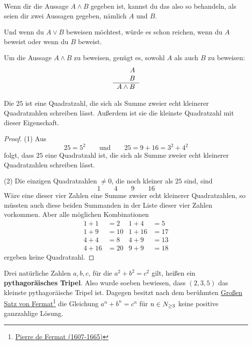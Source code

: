 \begin{bem}[*]
    Wenn dir die Aussage $A\land B$ gegeben ist, kannst du das also so behandeln, als seien dir zwei Aussagen gegeben, nämlich $A$ und $B$.
    
    Und wenn du $A\lor B$ beweisen möchtest, würde es schon reichen, wenn du $A$ beweist oder wenn du $B$ beweist.
\end{bem}


\begin{axiom} \label{undbeweise}
    Um die Aussage $A\land B$ zu beweisen, genügt es, sowohl $A$ als auch $B$ zu beweisen:
    \[\begin{tabular}{r}
        $A$ \\
        $B$ \\
        \hline 
        $A\land B$
    \end{tabular} \]
\end{axiom}


\begin{bsp}[*]
    Die $25$ ist eine Quadratzahl, die sich als Summe zweier echt kleinerer Quadratzahlen schreiben lässt. Außerdem ist sie die kleinste Quadratzahl mit dieser Eigenschaft.
\end{bsp}
\begin{proof}
    (1) Aus
        \[ 25=5^2 \qquad\text{und}\qquad 25 = 9 + 16 = 3^2 + 4^2 \]
    folgt, dass $25$ eine Quadratzahl ist, die sich als Summe zweier echt kleinerer Quadratzahlen schreiben lässt.

    (2) Die einzigen Quadratzahlen $\neq 0$, die noch kleiner als $25$ sind, sind
        \[ 1\qquad 4\qquad 9\qquad 16 \]
    Wäre eine dieser vier Zahlen eine Summe zweier echt kleinerer Quadratzahlen, so müssten auch diese beiden Summanden in der Liste dieser vier Zahlen vorkommen. Aber alle möglichen Kombinationen
    \begin{align*}
        1+1 & = 2 & 1+4 & = 5 \\
        1+ 9 & = 10 & 1+16 & = 17 \\
        4 + 4 & = 8 & 4+9 & = 13 \\
        4+16 & = 20 & 9+9 & = 18
    \end{align*}
    ergeben keine Quadratzahl.
\end{proof}


\begin{bem}[*]
    Drei natürliche Zahlen $a,b,c$, für die $a^2+b^2=c^2$ gilt, heißen ein \textbf{pythagoräisches Tripel}. Also wurde soeben bewiesen, dass $(2,3,5)$ das kleinste pythagoräische Tripel ist. Dagegen besitzt nach dem berühmten \href{https://de.wikipedia.org/wiki/Gro\%C3\%9Fer_Fermatscher_Satz}{Großen Satz von Fermat}\footnote{\href{https://de.wikipedia.org/wiki/Pierre_de_Fermat}{Pierre de Fermat (1607-1665)}} die Gleichung $a^n+b^n=c^n$ für $n\in \relax N_{\ge 3}$ keine positive ganzzahlige Lösung.
\end{bem}


